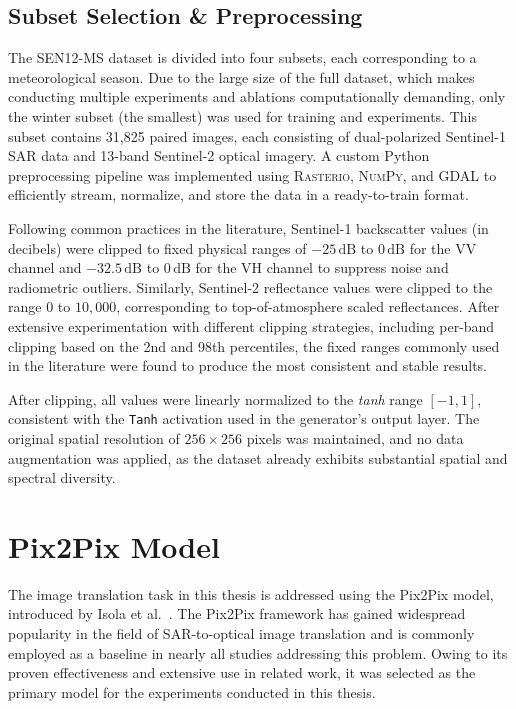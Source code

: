 \subsection{Subset Selection \& Preprocessing}
\label{subsec:preprocessing}
The SEN12-MS dataset is divided into four subsets, each corresponding to a meteorological season. Due to the large size of the full dataset, which makes conducting multiple experiments and ablations computationally demanding, only the winter subset (the smallest) was used for training and experiments. This subset contains 31,825 paired images, each consisting of dual-polarized Sentinel-1 SAR data and 13-band Sentinel-2 optical imagery. A custom Python preprocessing pipeline was implemented using \textsc{Rasterio}, \textsc{NumPy}, and \textsc{GDAL} to efficiently stream, normalize, and store the data in a ready-to-train format.  

Following common practices in the literature, Sentinel-1 backscatter values (in decibels) were clipped to fixed physical ranges of \(-25\,\text{dB}\) to \(0\,\text{dB}\) for the VV channel and \(-32.5\,\text{dB}\) to \(0\,\text{dB}\) for the VH channel to suppress noise and radiometric outliers. Similarly, Sentinel-2 reflectance values were clipped to the range \(0\) to \(10{,}000\), corresponding to top-of-atmosphere scaled reflectances. After extensive experimentation with different clipping strategies, including per-band clipping based on the 2nd and 98th percentiles, the fixed ranges commonly used in the literature were found to produce the most consistent and stable results. 

After clipping, all values were linearly normalized to the \textit{tanh} range \([-1, 1]\), consistent with the \texttt{Tanh} activation used in the generator’s output layer. The original spatial resolution of \(256 \times 256\) pixels was maintained, and no data augmentation was applied, as the dataset already exhibits substantial spatial and spectral diversity.

\section{Pix2Pix Model}
The image translation task in this thesis is addressed using the Pix2Pix model, introduced by Isola et al.~\cite{pix2pix_2018}. The Pix2Pix framework has gained widespread popularity in the field of SAR-to-optical image translation and is commonly employed as a baseline in nearly all studies addressing this problem. Owing to its proven effectiveness and extensive use in related work, it was selected as the primary model for the experiments conducted in this thesis.

